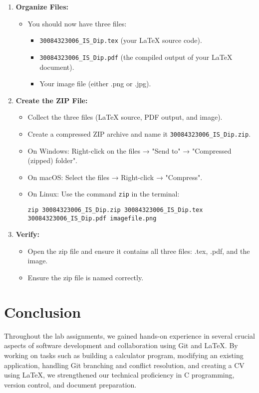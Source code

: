 \documentclass[a4paper,12pt]{article}
\begin{document}
\begin{enumerate}[label=\arabic*.]
    \item \textbf{Organize Files:}
    \begin{itemize}
        \item You should now have three files:
        \begin{itemize}
            \item \texttt{30084323006\_IS\_Dip.tex} (your LaTeX source code).
            \item \texttt{30084323006\_IS\_Dip.pdf} (the compiled output of your LaTeX document).
            \item Your image file (either .png or .jpg).
        \end{itemize}
    \end{itemize}

    \item \textbf{Create the ZIP File:}
    \begin{itemize}
        \item Collect the three files (LaTeX source, PDF output, and image).
        \item Create a compressed ZIP archive and name it \texttt{30084323006\_IS\_Dip.zip}.
        \item On Windows: Right-click on the files → "Send to" → "Compressed (zipped) folder".
        \item On macOS: Select the files → Right-click → "Compress".
        \item On Linux: Use the command \texttt{zip} in the terminal:
        \begin{verbatim}
zip 30084323006_IS_Dip.zip 30084323006_IS_Dip.tex 30084323006_IS_Dip.pdf imagefile.png
        \end{verbatim}
    \end{itemize}

    \item \textbf{Verify:}
    \begin{itemize}
        \item Open the zip file and ensure it contains all three files: .tex, .pdf, and the image.
        \item Ensure the zip file is named correctly.
    \end{itemize}
\end{enumerate}


\section{Conclusion}

Throughout the lab assignments, we gained hands-on experience in several crucial aspects of software development and collaboration using Git and LaTeX. By working on tasks such as building a calculator program, modifying an existing application, handling Git branching and conflict resolution, and creating a CV using LaTeX, we strengthened our technical proficiency in C programming, version control, and document preparation.
\end{document}
